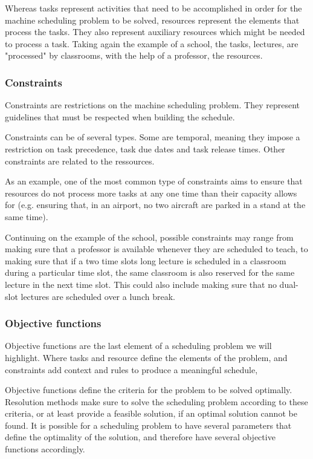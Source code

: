 \documentclass{mimosis}
\begin{document}
Whereas tasks represent activities that need to be accomplished in order for the machine scheduling problem to be solved, resources represent the elements that process the tasks. They also represent auxiliary resources which might be needed to process a task. Taking again the example of a school, the tasks, lectures, are "processed" by classrooms, with the help of a professor, the resources.

\subsubsection{Constraints}

Constraints are restrictions on the machine scheduling problem. They represent guidelines that must be respected when building the schedule.

Constraints can be of several types. Some are temporal, meaning they impose a restriction on task precedence, task due dates and task release times. Other constraints are related to the ressources.

As an example, one of the most common type of constraints aims to ensure that resources do not process more tasks at any one time than their capacity allows for (e.g. ensuring that, in an airport, no two aircraft are parked in a stand at the same time).

Continuing on the example of the school, possible constraints may range from making sure that a professor is available whenever they are scheduled to teach, to making sure that if a two time slots long lecture is scheduled in a classroom during a particular time slot, the same classroom is also reserved for the same lecture in the next time slot. This could also include making sure that no dual-slot lectures are scheduled over a lunch break.

\subsubsection{Objective functions}

Objective functions are the last element of a scheduling problem we will highlight. Where tasks and resource define the elements of the problem, and constraints add context and rules to produce a meaningful schedule, 

Objective functions define the criteria for the problem to be solved optimally. Resolution methods make sure to solve the scheduling problem according to these criteria, or at least provide a feasible solution, if an optimal solution cannot be found. It is possible for a scheduling problem to have several parameters that define the optimality of the solution, and therefore have several objective functions accordingly.
\end{document}
